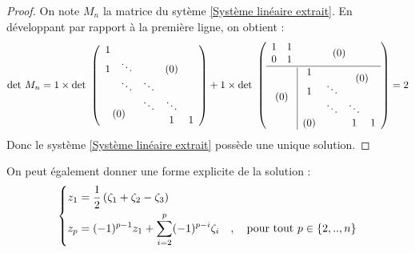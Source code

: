 \begin{proof}
On note $M_n$ la matrice du sytème \eqref{Système linéaire extrait}. En développant par rapport à la première ligne, on obtient :
\begin{gather*}
  \mbox{det }M_n =
  1 \times \mbox{det } \left(
  \begin{array}{ccccc}
    1 &                                         &        &        &   \\
    1 & \ddots                                  &        & (0)    &   \\
      & \ddots                                  & \ddots &        &   \\
    \multicolumn{2}{c}{\multirow{2}{*}{ (0) }}  & \ddots & \ddots &   \\
    \multicolumn{2}{c}{}                        &        & 1      & 1
  \end{array} \right)
  + 1 \times \mbox{det } \left(
  \begin{array}{cc|cccc}
    1 & 1                                       & \multicolumn{4}{c}{\multirow{2}{*}{ (0) }} \\
    0 & 1                                       & \multicolumn{4}{c}{}                       \\
    \hline
    \multicolumn{2}{c|}{\multirow{5}{*}{ (0) }} & 1   &        & \multicolumn{2}{c}{\multirow{2}{*}{ (0) }} \\
    \multicolumn{2}{c|}{}                       & 1   & \ddots & \multicolumn{2}{c}{}                       \\
    \multicolumn{2}{c|}{}                       &     & \ddots & \ddots &                                   \\
    \multicolumn{2}{c|}{}                       & (0) &        & 1      & 1
  \end{array} \right)
  = 2
\end{gather*}
Donc le système \eqref{Système linéaire extrait} possède une unique solution.
\end{proof}

On peut également donner une forme explicite de la solution :
\begin{equation}
  \left\{
  \begin{aligned}\notag
    z_1 &= \frac{1}{2}\left(\zeta_1 + \zeta_2 - \zeta_3\right) \\
    z_p &= (-1)^{p-1} z_1 + \sum_{i=2}^p (-1)^{p-i}\zeta_i \quad , \quad \mbox{pour tout } p \in \{2,..,n\}
  \end{aligned}
  \right.
\end{equation}

